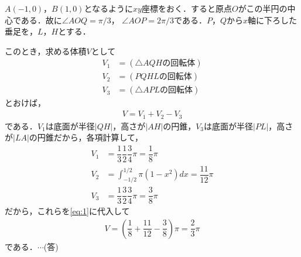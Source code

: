 \documentclass[../../main.tex]{subfiles}
\begin{document}
$A(-1,0)$，$B(1,0)$となるように$xy$座標をおく．すると原点$O$がこの半円の中心である．故に$\angle AOQ=\pi/3$，
$\angle AOP=2\pi/3$である．$P$，$Q$から$x$軸に下ろした垂足を，$L$，$H$とする．

このとき，求める体積$V$として
\begin{align}
  V_1&=(\triangle AQH\text{の回転体}) \\
  V_2&=(PQHL\text{の回転体}) \\
  V_3&=(\triangle APL\text{の回転体})
\end{align}
とおけば，
\begin{align}
  V=V_1+V_2-V_3\label{eq:1}
\end{align}
である．$V_1$は底面が半径$|QH|$，高さが$|AH|$の円錐，$V_3$は底面が半径$|PL|$，高さが$|LA|$の円錐だから，各項計算して，
\begin{align}
  V_1&=\dfrac{1}{3}\dfrac{1}{2}\dfrac{3}{4}\pi=\dfrac{1}{8}\pi \\
  V_2&=\int_{-1/2}^{1/2}\pi(1-x^2)dx=\dfrac{11}{12}\pi \\
  V_3&=\dfrac{1}{3}\dfrac{3}{2}\dfrac{3}{4}\pi=\dfrac{3}{8}\pi
\end{align}
だから，これらを\cref{eq:1}に代入して
\begin{align}
  V=\left(\dfrac{1}{8}+\dfrac{11}{12}-\dfrac{3}{8}\right)\pi=\dfrac{2}{3}\pi
\end{align}
である．$\cdots$(答)

\newpage
\end{document}
